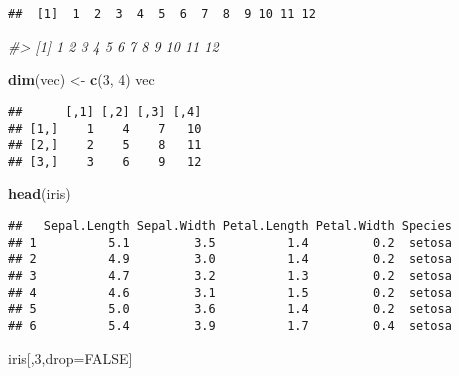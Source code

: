 \documentclass[]{article}
\newenvironment{Shaded}{\begin{snugshade}}{\end{snugshade}}
\newcommand{\CommentTok}[1]{\textcolor[rgb]{0.56,0.35,0.01}{\textit{#1}}}
\newcommand{\DecValTok}[1]{\textcolor[rgb]{0.00,0.00,0.81}{#1}}
\newcommand{\KeywordTok}[1]{\textcolor[rgb]{0.13,0.29,0.53}{\textbf{#1}}}
\newcommand{\NormalTok}[1]{#1}
\newcommand{\OtherTok}[1]{\textcolor[rgb]{0.56,0.35,0.01}{#1}}
\newcommand{\StringTok}[1]{\textcolor[rgb]{0.31,0.60,0.02}{#1}}
\begin{document}
\begin{verbatim}
##  [1]  1  2  3  4  5  6  7  8  9 10 11 12
\end{verbatim}

\begin{Shaded}
\begin{Highlighting}[]
\CommentTok{#>  [1]  1  2  3  4  5  6  7  8  9 10 11 12}

\KeywordTok{dim}\NormalTok{(vec) <-}\StringTok{ }\KeywordTok{c}\NormalTok{(}\DecValTok{3}\NormalTok{, }\DecValTok{4}\NormalTok{)}
\NormalTok{vec}
\end{Highlighting}
\end{Shaded}

\begin{verbatim}
##      [,1] [,2] [,3] [,4]
## [1,]    1    4    7   10
## [2,]    2    5    8   11
## [3,]    3    6    9   12
\end{verbatim}

\begin{Shaded}
\begin{Highlighting}[]
\KeywordTok{head}\NormalTok{(iris)}
\end{Highlighting}
\end{Shaded}

\begin{verbatim}
##   Sepal.Length Sepal.Width Petal.Length Petal.Width Species
## 1          5.1         3.5          1.4         0.2  setosa
## 2          4.9         3.0          1.4         0.2  setosa
## 3          4.7         3.2          1.3         0.2  setosa
## 4          4.6         3.1          1.5         0.2  setosa
## 5          5.0         3.6          1.4         0.2  setosa
## 6          5.4         3.9          1.7         0.4  setosa
\end{verbatim}

\begin{Shaded}
\begin{Highlighting}[]
\NormalTok{iris[,}\DecValTok{3}\NormalTok{,drop=}\OtherTok{FALSE}\NormalTok{]}
\end{Highlighting}
\end{Shaded}
\end{document}
